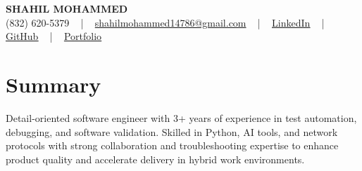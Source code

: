 \documentclass[letterpaper,10pt]{article}
\begin{document}
\begin{center}
    {\fontsize{14pt}{12pt}\selectfont \textbf{\MakeUppercase{Shahil Mohammed}}}\\ \vspace{2pt}
    \fontsize{10pt}{12pt}\selectfont (832) 620-5379 ~ | ~ \href{mailto:shahilmohammed14786@gmail.com}{shahilmohammed14786@gmail.com} ~ | ~  
    \href{https://www.linkedin.com/in/shahil-mohammed-9652931a1/}{\color{blue}\underline{LinkedIn}}  ~ | ~ 
    \href{https://github.com/freakbeast14}{\color{blue}\underline{GitHub}} ~ | ~ 
    \href{https://shahil-mohammed.netlify.app/}{\color{blue}\underline{Portfolio}}
    \vspace{-8pt}
\end{center}

\section{Summary}
\vspace{-2pt}\fontsize{8pt}{9pt}\selectfont
Detail-oriented software engineer with 3+ years of experience in test automation, debugging, and software validation. Skilled in Python, AI tools, and network protocols with strong collaboration and troubleshooting expertise to enhance product quality and accelerate delivery in hybrid work environments.
 \vspace{-5pt}
 
\vspace{-2pt}
\end{document}
